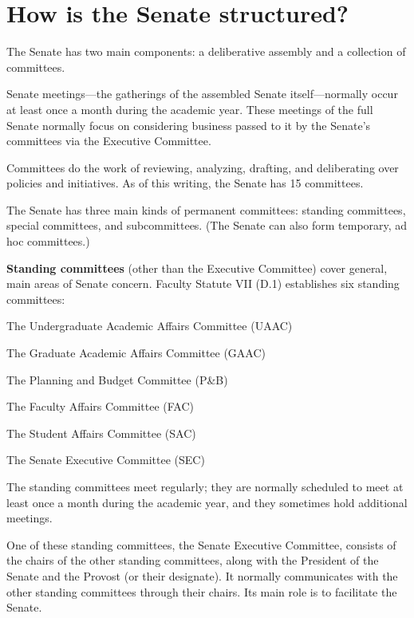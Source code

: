 \documentclass[12pt]{article}
\begin{document}
\section{How is the Senate
structured?}\label{how-is-the-senate-structured}

The Senate has two main components: a deliberative assembly and a
collection of committees.

Senate meetings---the gatherings of the assembled Senate
itself---normally occur at least once a month during the academic year.
These meetings of the full Senate normally focus on considering business
passed to it by the Senate's committees via the Executive Committee.

Committees do the work of reviewing, analyzing, drafting, and
deliberating over policies and initiatives. As of this writing, the
Senate has 15 committees.

The Senate has three main kinds of permanent committees: standing
committees, special committees, and subcommittees. (The Senate can also
form temporary, ad hoc committees.)

\medskip \noindent
\textbf{Standing committees} (other than the Executive Committee) cover
general, main areas of Senate concern. Faculty Statute VII (D.1)
establishes six standing committees:

\begin{cmtelist}
\item  The Undergraduate Academic Affairs Committee (UAAC)
\item  The Graduate Academic Affairs Committee (GAAC)
\item  The Planning and Budget Committee (P\&B)
\item  The Faculty Affairs Committee (FAC)
\item  The Student Affairs Committee (SAC)
\item  The Senate Executive Committee (SEC)
\end{cmtelist}

\noindent The standing committees meet regularly; they are normally scheduled to
meet at least once a month during the academic year, and they sometimes
hold additional meetings.

One of these standing committees, the Senate Executive Committee,
consists of the chairs of the other standing committees, along with the
President of the Senate and the Provost (or their designate). It
normally communicates with the other standing committees through their
chairs. Its main role is to facilitate the Senate.
\end{document}
